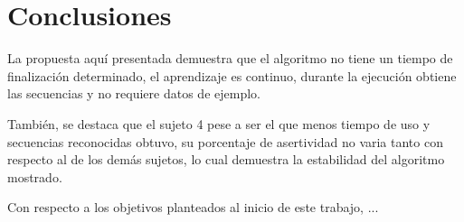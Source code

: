 \section{Conclusiones}
La propuesta aqu\'{i} presentada demuestra que el algoritmo no tiene
 un tiempo de finalizaci\'on determinado, el aprendizaje es continuo, durante 
 la ejecuci\'on obtiene las secuencias y no requiere datos de ejemplo.
 
Tambi\'en, se destaca que el sujeto 4 pese a ser el que menos tiempo de uso y 
 secuencias reconocidas obtuvo, su porcentaje de asertividad no varia tanto con 
 respecto al de los dem\'as sujetos, lo cual demuestra la estabilidad del 
 algoritmo mostrado. 
 
Con respecto a los objetivos planteados al inicio de este trabajo, ...